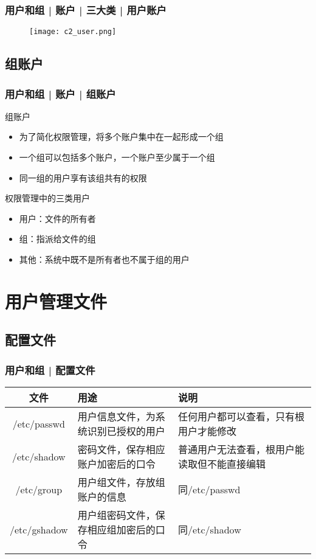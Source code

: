 \begin{frame}
  \frametitle{用户和组 | 账户 | 三大类 | 用户账户}
  \begin{figure}
    \centering
    \texttt{[image: c2\_user.png]}
  \end{figure}
\end{frame}

\subsection{组账户}
\begin{frame}
  \frametitle{用户和组 | 账户 | 组账户}
  \begin{block}{组账户}
    \begin{itemize}
      \item 为了简化权限管理，将多个账户集中在一起形成一个组
      \item 一个组可以包括多个账户，一个账户至少属于一个组
      \item 同一组的用户享有该组共有的权限
    \end{itemize}
  \end{block}
  \pause
  \begin{block}{权限管理中的\alert{三类用户}}
    \begin{itemize}
      \item 用户：文件的所有者
      \item 组：指派给文件的组
      \item 其他：系统中既不是所有者也不属于组的用户
    \end{itemize}
  \end{block}
\end{frame}

\section{用户管理文件}
\subsection{配置文件}
\begin{frame}
  \frametitle{用户和组 | \alert{配置文件}}
  \begin{table}
    \centering
    \begin{tabularx}{\textwidth}{cXX}
      \hline
      \rowcolor{blue!50}文件 & 用途 & 说明\\
      \hline
      /etc/passwd & 用户信息文件，为系统识别已授权的用户 & 任何用户都可以查看，只有根用户才能修改\\
      /etc/shadow & 密码文件，保存相应账户加密后的口令 & 普通用户无法查看，根用户能读取但不能直接编辑\\
      /etc/group & 用户组文件，存放组账户的信息 & 同/etc/passwd\\
      /etc/gshadow & 用户组密码文件，保存相应组加密后的口令 & 同/etc/shadow\\
      \hline
    \end{tabularx}
  \end{table}
\end{frame}

